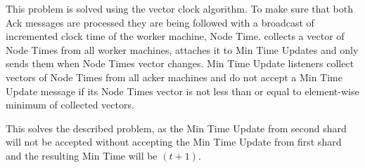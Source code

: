This problem is solved using the vector clock algorithm. To make sure that both Ack messages are processed they are being followed with a broadcast of incremented clock time of the worker machine, Node Time. \tracker collects a vector of Node Times from all worker machines, attaches it to Min Time Updates and only sends them when Node Times vector changes. Min Time Update listeners collect vectors of Node Times from all acker machines and do not accept a Min Time Update message if its Node Times vector is not less than or equal to element-wise minimum of collected vectors.

This solves the described problem, as the Min Time Update from second shard will not be accepted without accepting the Min Time Update from first shard and the resulting Min Time will be $(t+1)$.


